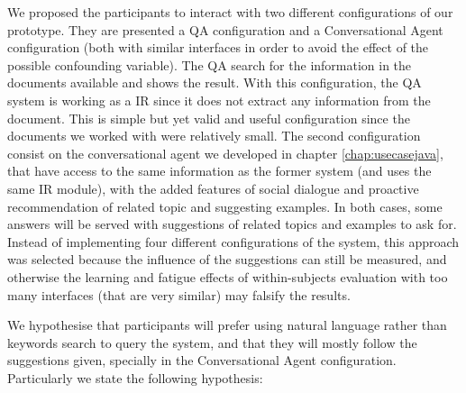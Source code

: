 We proposed the participants to interact with two different configurations of our prototype. They are presented a \ac{QA} configuration and a Conversational Agent configuration (both with similar interfaces in order to avoid the effect of the possible confounding variable). The \ac{QA} search for the information in the documents available and shows the result. With this configuration, the \ac{QA} system is working as a \ac{IR} since it does not extract any information from the document. This is simple but yet valid and useful configuration since the documents we worked with were relatively small. The second configuration consist on the conversational agent we developed in chapter \ref{chap:usecasejava}, that have access to the same information as the former system (and uses the same \ac{IR} module), with the added features of social dialogue and proactive recommendation of related topic and suggesting examples. In both cases, some answers will be served with suggestions of related topics and examples to ask for. Instead of implementing four different configurations of the system, this approach was selected because the influence of the suggestions can still be measured, and otherwise the learning and fatigue effects of within-subjects evaluation with too many interfaces (that are very similar) may falsify the results.

We hypothesise that participants will prefer using natural language rather than keywords search to query the system, and that they will mostly follow the suggestions given, specially in the Conversational Agent configuration. Particularly we state the following hypothesis:

